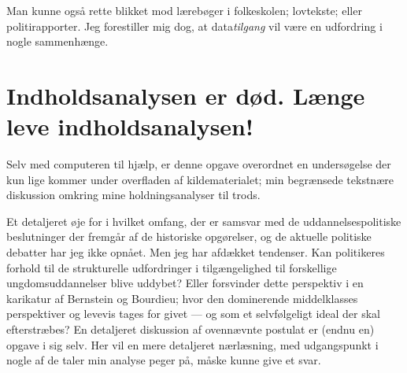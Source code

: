 Man kunne også rette blikket mod lærebøger i folkeskolen; lovtekste; eller politirapporter. Jeg forestiller mig dog, at data\textit{tilgang} vil være en udfordring i nogle sammenhænge.

\section{Indholdsanalysen er død. Længe leve indholdsanalysen!}
Selv med computeren til hjælp, er denne opgave overordnet en undersøgelse der kun lige kommer under overfladen af kildematerialet;
min begrænsede tekstnære diskussion omkring mine holdningsanalyser til trods.

Et detaljeret øje for i hvilket omfang, 
der er samsvar med de uddannelsespolitiske beslutninger der fremgår af de historiske opgørelser,
og de aktuelle politiske debatter har jeg ikke opnået.
Men jeg har afdækket tendenser.
Kan politikeres forhold til de strukturelle udfordringer i tilgængelighed til forskellige ungdomsuddannelser blive uddybet?
Eller forsvinder dette perspektiv i en karikatur af Bernstein og Bourdieu; hvor den dominerende middelklasses perspektiver og levevis tages for givet — og som et selvfølgeligt ideal der skal efterstræbes?
En detaljeret diskussion af ovennævnte postulat er (endnu en) opgave i sig selv.
Her vil en mere detaljeret nærlæsning, med udgangspunkt i nogle af de taler min analyse peger på, måske kunne give et svar.

